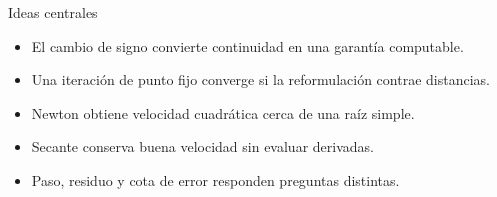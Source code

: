 \documentclass[aspectratio=169,12pt]{beamer}
\begin{document}
\begin{frame}{Ideas centrales}
\begin{itemize}
  \item El cambio de signo convierte continuidad en una garantía computable.
  \item Una iteración de punto fijo converge si la reformulación contrae distancias.
  \item Newton obtiene velocidad cuadrática cerca de una raíz simple.
  \item Secante conserva buena velocidad sin evaluar derivadas.
  \item Paso, residuo y cota de error responden preguntas distintas.
\end{itemize}
\end{frame}
\end{document}
